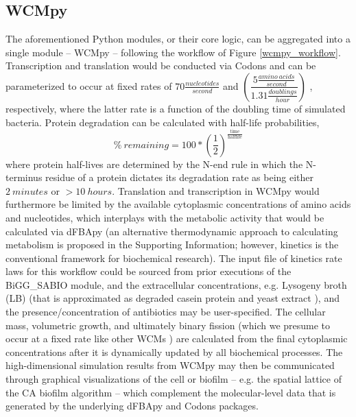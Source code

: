 \subsection*{WCMpy}
The aforementioned Python modules, or their core logic, can be aggregated into a single module -- WCMpy -- following the workflow of Figure \ref{wcmpy_workflow}. Transcription and translation would be conducted via Codons and can be parameterized to occur at fixed rates of $70 \frac{nucleotides}{second}$ \cite{Dennis2009VaryingColi,Vogel1995EffectsColi} and $\left(\dfrac{5 \frac{amino~acids}{second}}{1.31 \frac{doublings}{hour}}\right)$ \cite{Young1976PolypeptideRate}, respectively, where the latter rate is a function of the doubling time of simulated bacteria. Protein degradation can be calculated with half-life probabilities, 
\begin{equation} \label{protein_halflife}
    \% ~remaining = 100*\left(\dfrac{1}{2}\right)^{\frac{\text{time}}{\text{halflife}}}
\end{equation} 
where protein half-lives are determined by the N-end rule \cite{Tobias1991TheBacteria} in which the N-terminus residue of a protein dictates its degradation rate as being either $2~minutes$ or $>10~hours$. Translation and transcription in WCMpy would furthermore be limited by the available cytoplasmic concentrations of amino acids and nucleotides, which interplays with the metabolic activity that would be calculated via dFBApy (an alternative thermodynamic approach to calculating metabolism is proposed in the Supporting Information; however, kinetics is the conventional framework for biochemical research). The input file of kinetics rate laws for this workflow could be sourced from prior executions of the BiGG\_SABIO module, and the extracellular concentrations, e.g. Lysogeny broth (LB) \cite{LysogenyBroth} (that is approximated as degraded casein protein \cite{Jolles1962AminoPara--casein} and yeast extract \cite{YeastSpread}), and the presence/concentration of antibiotics may be user-specified. The cellular mass, volumetric growth, and ultimately binary fission \cite{Donachie1968RelationshipReplication} (which we presume to occur at a fixed rate like other WCMs \cite{Karr2012}) are calculated from the final cytoplasmic concentrations after it is dynamically updated by all biochemical processes. The high-dimensional simulation results from WCMpy may then be communicated through graphical visualizations of the cell or biofilm -- e.g. the spatial lattice of the CA biofilm algorithm -- which complement the molecular-level data that is generated by the underlying dFBApy and Codons packages. 

